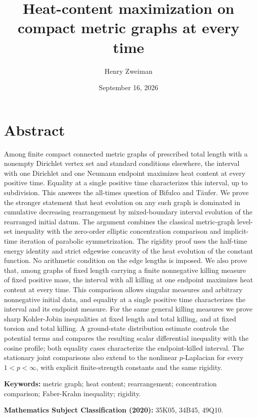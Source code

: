 \documentclass[11pt]{article}
\title{Heat-content maximization on compact metric graphs at every time}
\author{Henry Zweiman}
\date{September 16, 2026}
\begin{document}
\maketitle
{}\section{Abstract}\label{abstract}

Among finite compact connected metric graphs of prescribed total length
with a nonempty Dirichlet vertex set and standard conditions elsewhere,
the interval with one Dirichlet and one Neumann endpoint maximizes heat
content at every positive time. Equality at a single positive time
characterizes this interval, up to subdivision. This answers the
all-times question of Bifulco and Täufer. We prove the stronger
statement that heat evolution on any such graph is dominated in
cumulative decreasing rearrangement by mixed-boundary interval evolution
of the rearranged initial datum. The argument combines the classical
metric-graph level-set inequality with the zero-order elliptic
concentration comparison and implicit-time iteration of parabolic
symmetrization. The rigidity proof uses the half-time energy identity
and strict edgewise concavity of the heat evolution of the constant
function. No arithmetic condition on the edge lengths is imposed. We
also prove that, among graphs of fixed length carrying a finite
nonnegative killing measure of fixed positive mass, the interval with
all killing at one endpoint maximizes heat content at every time. This
comparison allows singular measures and arbitrary nonnegative initial
data, and equality at a single positive time characterizes the interval
and its endpoint measure. For the same general killing measures we prove
sharp Kohler-Jobin inequalities at fixed length and total killing, and
at fixed torsion and total killing. A ground-state distribution estimate
controls the potential terms and compares the resulting scalar
differential inequality with the cosine profile; both equality cases
characterize the endpoint-killed interval. The stationary joint
comparisons also extend to the nonlinear \(p\)-Laplacian for every
\(1<p<\infty\), with explicit finite-strength constants and the same
rigidity.

\textbf{Keywords:} metric graph; heat content; rearrangement;
concentration comparison; Faber-Krahn inequality; rigidity.

\textbf{Mathematics Subject Classification (2020):} 35K05, 34B45, 49Q10.
\end{document}
